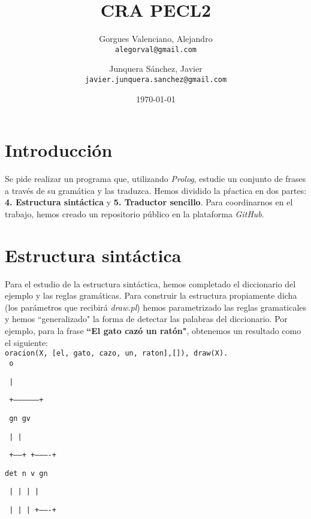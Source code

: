 \documentclass[a4paper]{article}
\title{CRA PECL2}
\author{Gorgues Valenciano, Alejandro\\
        \texttt{alegorval@gmail.com}
        \and
        Junquera Sánchez, Javier\\
        \texttt{javier.junquera.sanchez@gmail.com}}
\date{\today}
\begin{document}
    \maketitle


    \obeyspaces


    \section*{Introducción}

    Se pide realizar un programa que, utilizando \emph{Prolog}, estudie un conjunto de frases a través de su gramática y las traduzca. Hemos dividido la pŕactica en dos partes: \textbf{4. Estructura sintáctica} y \textbf{5. Traductor sencillo}. Para coordinarnos en el trabajo, hemos creado un repositorio público en la plataforma \emph{GitHub}\cite{REPO}.

    \section*{Estructura sintáctica}

    Para el estudio de la estructura sintáctica, hemos completado el diccionario del ejemplo y las reglas gramáticas. Para construir la estructura propiamente dicha (los parámetros que recibirá \emph{draw.pl}) hemos parametrizado las reglas gramaticales y hemos ``generalizado" la forma de detectar las palabras del diccionario. Por ejemplo, para la frase \textbf{``El gato cazó un ratón"}, obtenemos un resultado como el siguiente:\\

        \texttt{oracion(X, [el, gato, cazo, un, raton],[]), draw(X).}\\

        \texttt{                   o}

        \texttt{                   |}

        \texttt{     +------------------+}

        \texttt{     gn                 gv}

        \texttt{     |                  |}

        \texttt{ +------+       +----------+}

        \texttt{det     n       v          gn}

        \texttt{ |      |       |          |}

        \texttt{ |      |       |      +-------+}
\end{document}
